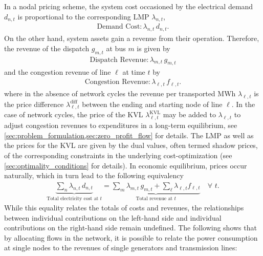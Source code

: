 \documentclass[11pt,twocolumn]{article}
\newcommand{\Forall}[1]{\hspace{10pt} \forall \,\, #1 }
\newcommand{\nodalgeneration}[1][n]{g_{#1,t}}
\newcommand{\flow}{f_{\ell,t}}
\newcommand{\lmp}[1][n]{\lambda_{#1,t}}
\newcommand{\lmpdiff}[1][\ell]{\lmp[#1]^\text{diff}}
\newcommand{\lmpkvl}[1][\ell]{\lmp[#1]^\text{KVL}}
\newcommand{\demand}[1][n]{d_{#1,t}}
\newcommand{\incidence}[1][n]{K_{#1,\ell}}
\begin{document}
In a nodal pricing scheme, the system cost occasioned by the electrical demand $\demand$ is proportional to the corresponding \ac{LMP} $\lmp$, 
\begin{align}
    \text{Demand Cost}: \lmp\, \demand .
    \label{eq:demand_cost}
\end{align}
On the other hand, system assets gain a revenue from their operation. Therefore, the revenue of the dispatch $\nodalgeneration[m]$ at bus $m$ is given by 
\begin{align}
    \text{Dispatch Revenue}: \lmp[m] \, \nodalgeneration[m] 
    \label{eq:dispatch_revenue}
\end{align}
and the congestion revenue of line $\ell$ at time $t$ by 
\begin{align}
    \text{Congestion Revenue}: \lmp[\ell]\, \flow .
    \label{eq:congestion_revenue}
\end{align}
where in the absence of network cycles the revenue per transported MWh $\lmp[\ell]$ is the price difference $\lmpdiff$ between the ending and starting node of line $\ell$. In the case of network cycles, the price of the \ac{KVL} $\lmpkvl$ may be added to $\lmp[\ell]$ to adjust congestion revenues to expenditures in a long-term equilibrium, see \cref{sec:problem_formulation,sec:zero_profit_flow} for details. The \ac{LMP} as well as the prices for the \ac{KVL} are given by the dual values, often termed shadow prices, of the corresponding constraints in the underlying cost-optimization (see \cref{sec:optimality_conditions} for details).   
In economic equilibrium, prices occur naturally, which in turn lead to the following equivalency
\begin{align}
    \underbrace{\sum_{n} \lmp\, \demand}_{\text{Total electricity cost at $t$}}  = \underbrace{\sum_{m} \lmp[m]\, \nodalgeneration[m] + \sum_{\ell} \lmp[\ell] \flow}_{\text{Total revenue at $t$}}\, \Forall{t} .
    \label{eq:total-demand-cost}
\end{align}
While this equality relates the totals of costs and revenues, the relationships between individual contributions on the left-hand side and individual contributions on the right-hand side remain undefined. The following shows that by allocating flows in the network, it is possible to relate the power consumption at single nodes to the revenues of single generators and transmission lines: 
\end{document}
